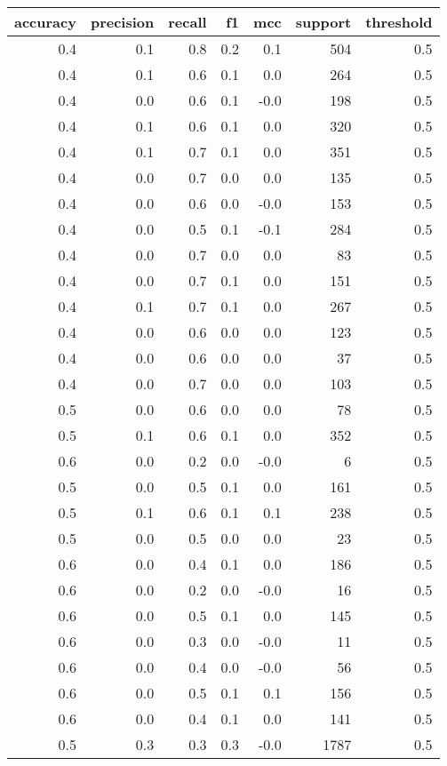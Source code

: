 \begin{tabular}{rrrrrrr}
\toprule
accuracy & precision & recall & f1 & mcc & support & threshold \\
\midrule
0.4 & 0.1 & 0.8 & 0.2 & 0.1 & 504 & 0.5 \\
0.4 & 0.1 & 0.6 & 0.1 & 0.0 & 264 & 0.5 \\
0.4 & 0.0 & 0.6 & 0.1 & -0.0 & 198 & 0.5 \\
0.4 & 0.1 & 0.6 & 0.1 & 0.0 & 320 & 0.5 \\
0.4 & 0.1 & 0.7 & 0.1 & 0.0 & 351 & 0.5 \\
0.4 & 0.0 & 0.7 & 0.0 & 0.0 & 135 & 0.5 \\
0.4 & 0.0 & 0.6 & 0.0 & -0.0 & 153 & 0.5 \\
0.4 & 0.0 & 0.5 & 0.1 & -0.1 & 284 & 0.5 \\
0.4 & 0.0 & 0.7 & 0.0 & 0.0 & 83 & 0.5 \\
0.4 & 0.0 & 0.7 & 0.1 & 0.0 & 151 & 0.5 \\
0.4 & 0.1 & 0.7 & 0.1 & 0.0 & 267 & 0.5 \\
0.4 & 0.0 & 0.6 & 0.0 & 0.0 & 123 & 0.5 \\
0.4 & 0.0 & 0.6 & 0.0 & 0.0 & 37 & 0.5 \\
0.4 & 0.0 & 0.7 & 0.0 & 0.0 & 103 & 0.5 \\
0.5 & 0.0 & 0.6 & 0.0 & 0.0 & 78 & 0.5 \\
0.5 & 0.1 & 0.6 & 0.1 & 0.0 & 352 & 0.5 \\
0.6 & 0.0 & 0.2 & 0.0 & -0.0 & 6 & 0.5 \\
0.5 & 0.0 & 0.5 & 0.1 & 0.0 & 161 & 0.5 \\
0.5 & 0.1 & 0.6 & 0.1 & 0.1 & 238 & 0.5 \\
0.5 & 0.0 & 0.5 & 0.0 & 0.0 & 23 & 0.5 \\
0.6 & 0.0 & 0.4 & 0.1 & 0.0 & 186 & 0.5 \\
0.6 & 0.0 & 0.2 & 0.0 & -0.0 & 16 & 0.5 \\
0.6 & 0.0 & 0.5 & 0.1 & 0.0 & 145 & 0.5 \\
0.6 & 0.0 & 0.3 & 0.0 & -0.0 & 11 & 0.5 \\
0.6 & 0.0 & 0.4 & 0.0 & -0.0 & 56 & 0.5 \\
0.6 & 0.0 & 0.5 & 0.1 & 0.1 & 156 & 0.5 \\
0.6 & 0.0 & 0.4 & 0.1 & 0.0 & 141 & 0.5 \\
0.5 & 0.3 & 0.3 & 0.3 & -0.0 & 1787 & 0.5 \\
\bottomrule
\end{tabular}
